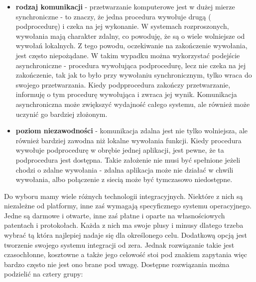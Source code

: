 \begin{itemize}
	\item \textbf{rodzaj komunikacji} - przetwarzanie komputerowe jest w dużej mierze synchroniczne - to znaczy, że jedna procedura wywołuje drugą ( podprocedurę) i czeka na jej wykonanie. W systemach rozproszonych, wywołania mają charakter zdalny, co powoduję, że są o wiele wolniejsze od wywołań lokalnych. Z tego powodu, oczekiwanie na zakończenie wywołania, jest często niepożądane. W takim wypadku można wykorzystać podejście asynchroniczne - procedura wywołująca podprocedurę, lecz nie czeka na jej zakończenie, tak jak to było przy wywołaniu synchronicznym, tylko wraca do swojego przetwarzania. Kiedy podpprocedura zakończy przetwarzanie, informuję o tym procedurę wywołująca i zwraca jej wynik. Komunikacja asynchroniczna może zwiększyć wydajność całego systemu, ale również może uczynić go bardziej złożonym.
	\item \textbf{poziom niezawodności} - komunikacja zdalna jest nie tylko wolniejsza, ale również bardziej zawodna niż lokalne wywołania funkcji. Kiedy procedura wywołuje podprocedurę w obrębie jednej aplikacji, jest pewne, że ta podprocedura jest dostępna. Takie założenie nie musi być spełnione jeżeli chodzi o zdalne wywołania - zdalna aplikacja może nie działać w chwili wywołania, albo połączenie z siecią może być tymczasowo niedostępne.
\end{itemize}

Do wyboru mamy wiele różnych technologii integracyjnych. Niektóre z nich są niezależne od platformy, inne zaś wymagają specyficznego systemu operacyjnego. Jedne są darmowe i otwarte, inne zaś płatne i oparte na własnościowych patentach i protokołach. Każda z nich ma swoje plusy i minusy dlatego trzeba wybrać tą która najlepiej nadaje się dla określonego celu. Dodatkową opcją jest tworzenie swojego systemu integracji od zera. Jednak rozwiązanie takie jest czasochłonne, kosztowne a także jego celowość stoi pod znakiem zapytania więc bardzo często nie jest ono brane pod uwagę.
Dostępne rozwiązania można podzielić na cztery grupy: \cite{chappell2004}

